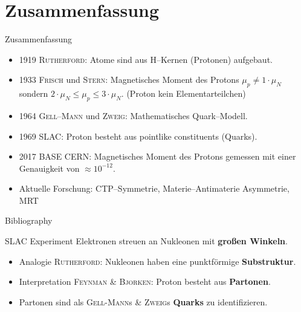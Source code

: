 \documentclass[t,9pt]{beamer}
\begin{document}
        \section{Zusammenfassung}

        \begin{frame}{Zusammenfassung}
                \begin{itemize}
                        \item 1919 \textsc{Rutherford}: Atome sind aus H--Kernen (Protonen) aufgebaut.
                        \item 1933 \textsc{Frisch} und \textsc{Stern}: Magnetisches Moment des Protons $\mu _p\neq 1\cdot \mu _N$ sondern $2\cdot \mu _N\leq \mu _p\leq 3\cdot \mu _N$. (Proton kein Elementarteilchen)
                        \item 1964 \textsc{Gell--Mann} und \textsc{Zweig}: Mathematisches Quark--Modell.
                        \item 1969 SLAC: Proton besteht aus \glqq pointlike constituents\grqq{} (Quarks).
                        \item 2017 BASE CERN: Magnetisches Moment des Protons gemessen mit einer Genauigkeit von $\approx 10^{-12}$.
                        \item Aktuelle Forschung: CTP--Symmetrie, Materie--Antimaterie Asymmetrie, MRT
                \end{itemize}         
        \end{frame}

        \begin{frame}[allowframebreaks]{Bibliography}
                \tiny
                
                
        \end{frame}

        \iffalse\begin{frame}{SLAC Experiment}
                Elektronen streuen an Nukleonen mit \textbf{großen Winkeln}. %
                \begin{itemize}
                        \item Analogie \textsc{Rutherford}: Nukleonen haben eine punktförmige \textbf{Substruktur}.
                                \pause
                        \item Interpretation \textsc{Feynman} \& \textsc{Bjorken}: Proton besteht aus \textbf{Partonen}.
                        \item Partonen sind als \textsc{Gell-Mann}s \& \textsc{Zweig}s \textbf{Quarks} zu identifizieren. %
                \end{itemize}
        \end{frame}
\end{document}
